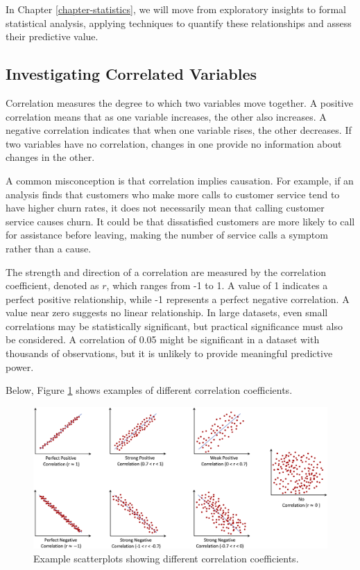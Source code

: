 \documentclass[
  11pt,
]{book}
\theoremstyle{definition}
\theoremstyle{definition}
\theoremstyle{definition}
\theoremstyle{definition}
\theoremstyle{remark}
\begin{document}
In Chapter \ref{chapter-statistics}, we will move from exploratory insights to formal statistical analysis, applying techniques to quantify these relationships and assess their predictive value.

\subsection{Investigating Correlated Variables}\label{investigating-correlated-variables}

Correlation measures the degree to which two variables move together. A positive correlation means that as one variable increases, the other also increases. A negative correlation indicates that when one variable rises, the other decreases. If two variables have no correlation, changes in one provide no information about changes in the other.

A common misconception is that correlation implies causation. For example, if an analysis finds that customers who make more calls to customer service tend to have higher churn rates, it does not necessarily mean that calling customer service causes churn. It could be that dissatisfied customers are more likely to call for assistance before leaving, making the number of service calls a symptom rather than a cause.

The strength and direction of a correlation are measured by the correlation coefficient, denoted as \(r\), which ranges from -1 to 1. A value of 1 indicates a perfect positive relationship, while -1 represents a perfect negative correlation. A value near zero suggests no linear relationship. In large datasets, even small correlations may be statistically significant, but practical significance must also be considered. A correlation of 0.05 might be significant in a dataset with thousands of observations, but it is unlikely to provide meaningful predictive power.

Below, Figure \ref{fig:correlation} shows examples of different correlation coefficients.

\begin{figure}[H]

{\centering \includegraphics[width=1\linewidth]{images/ch4_correlation} 

}

\caption{Example scatterplots showing different correlation coefficients.}\label{fig:correlation}
\end{figure}
\end{document}
